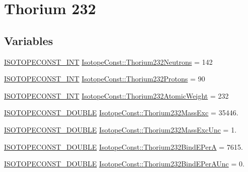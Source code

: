 \hypertarget{group___isotope_const-_thorium-_th232}{}\section{Thorium 232}
\label{group___isotope_const-_thorium-_th232}
\subsection*{Variables}
\begin{DoxyCompactItemize}
\item 
\mbox{\hyperlink{group___isotope_const-_macros_ga5f18360b3e99483a35c32d789e62621c}{I\+S\+O\+T\+O\+P\+E\+C\+O\+N\+S\+T\+\_\+\+I\+NT}} \mbox{\hyperlink{group___isotope_const-_thorium-_th232_ga0959669b3152baa562598ebeeb8faa22}{Isotope\+Const\+::\+Thorium232\+Neutrons}} = 142
\item 
\mbox{\hyperlink{group___isotope_const-_macros_ga5f18360b3e99483a35c32d789e62621c}{I\+S\+O\+T\+O\+P\+E\+C\+O\+N\+S\+T\+\_\+\+I\+NT}} \mbox{\hyperlink{group___isotope_const-_thorium-_th232_ga1c356dcd1ce9a9d3734ce059279428ce}{Isotope\+Const\+::\+Thorium232\+Protons}} = 90
\item 
\mbox{\hyperlink{group___isotope_const-_macros_ga5f18360b3e99483a35c32d789e62621c}{I\+S\+O\+T\+O\+P\+E\+C\+O\+N\+S\+T\+\_\+\+I\+NT}} \mbox{\hyperlink{group___isotope_const-_thorium-_th232_gac8649607f8f9e8851afaa4e3788253b0}{Isotope\+Const\+::\+Thorium232\+Atomic\+Weight}} = 232
\item 
\mbox{\hyperlink{group___isotope_const-_macros_ga8f45a7272ce02c0b4c65c44636ed719a}{I\+S\+O\+T\+O\+P\+E\+C\+O\+N\+S\+T\+\_\+\+D\+O\+U\+B\+LE}} \mbox{\hyperlink{group___isotope_const-_thorium-_th232_ga3176e3204e69fe0406e62c10558d9396}{Isotope\+Const\+::\+Thorium232\+Mass\+Exc}} = 35446.
\item 
\mbox{\hyperlink{group___isotope_const-_macros_ga8f45a7272ce02c0b4c65c44636ed719a}{I\+S\+O\+T\+O\+P\+E\+C\+O\+N\+S\+T\+\_\+\+D\+O\+U\+B\+LE}} \mbox{\hyperlink{group___isotope_const-_thorium-_th232_ga88af8e0a7b7864be6e8582c16b45a5a1}{Isotope\+Const\+::\+Thorium232\+Mass\+Exc\+Unc}} = 1.
\item 
\mbox{\hyperlink{group___isotope_const-_macros_ga8f45a7272ce02c0b4c65c44636ed719a}{I\+S\+O\+T\+O\+P\+E\+C\+O\+N\+S\+T\+\_\+\+D\+O\+U\+B\+LE}} \mbox{\hyperlink{group___isotope_const-_thorium-_th232_gaa2411658be2eb93eceb96578c8fdc8d2}{Isotope\+Const\+::\+Thorium232\+Bind\+E\+PerA}} = 7615.
\item 
\mbox{\hyperlink{group___isotope_const-_macros_ga8f45a7272ce02c0b4c65c44636ed719a}{I\+S\+O\+T\+O\+P\+E\+C\+O\+N\+S\+T\+\_\+\+D\+O\+U\+B\+LE}} \mbox{\hyperlink{group___isotope_const-_thorium-_th232_ga8e332639b5d5bdbdc798cebd0cc0b379}{Isotope\+Const\+::\+Thorium232\+Bind\+E\+Per\+A\+Unc}} = 0.

\end{DoxyCompactItemize}
